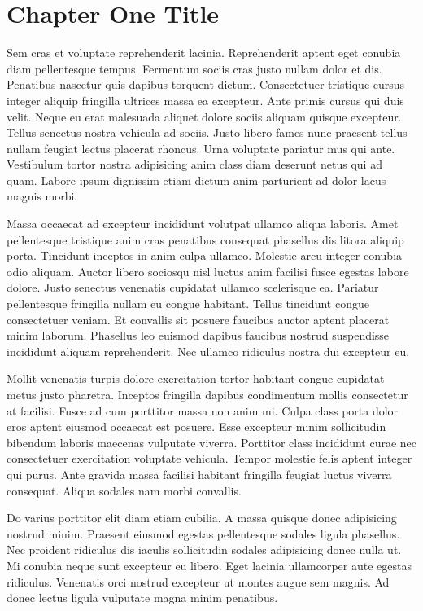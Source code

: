 \chapter{Chapter One Title}

Sem cras et voluptate reprehenderit lacinia. Reprehenderit aptent eget conubia diam pellentesque tempus. Fermentum sociis cras justo nullam dolor et dis. Penatibus nascetur quis dapibus torquent dictum. Consectetuer tristique cursus integer aliquip fringilla ultrices massa ea excepteur. Ante primis cursus qui duis velit. Neque eu erat malesuada aliquet dolore sociis aliquam quisque excepteur.
Tellus senectus nostra vehicula ad sociis. Justo libero fames nunc praesent tellus nullam feugiat lectus placerat rhoncus. Urna voluptate pariatur mus qui ante. Vestibulum tortor nostra adipisicing anim class diam deserunt netus qui ad quam. Labore ipsum dignissim etiam dictum anim parturient ad dolor lacus magnis morbi.

Massa occaecat ad excepteur incididunt volutpat ullamco aliqua laboris. Amet pellentesque tristique anim cras penatibus consequat phasellus dis litora aliquip porta. Tincidunt inceptos in anim culpa ullamco. Molestie arcu integer conubia odio aliquam. Auctor libero sociosqu nisl luctus anim facilisi fusce egestas labore dolore. Justo senectus venenatis cupidatat ullamco scelerisque ea. Pariatur pellentesque fringilla nullam eu congue habitant. Tellus tincidunt congue consectetuer veniam. Et convallis sit posuere faucibus auctor aptent placerat minim laborum. Phasellus leo euismod dapibus faucibus nostrud suspendisse incididunt aliquam reprehenderit. Nec ullamco ridiculus nostra dui excepteur eu.

Mollit venenatis turpis dolore exercitation tortor habitant congue cupidatat metus justo pharetra. Inceptos fringilla dapibus condimentum mollis consectetur at facilisi. Fusce ad cum porttitor massa non anim mi. Culpa class porta dolor eros aptent eiusmod occaecat est posuere. Esse excepteur minim sollicitudin bibendum laboris maecenas vulputate viverra. Porttitor class incididunt curae nec consectetuer exercitation voluptate vehicula. Tempor molestie felis aptent integer qui purus. Ante gravida massa facilisi habitant fringilla feugiat luctus viverra consequat. Aliqua sodales nam morbi convallis.

Do varius porttitor elit diam etiam cubilia. A massa quisque donec adipisicing nostrud minim. Praesent eiusmod egestas pellentesque sodales ligula phasellus. Nec proident ridiculus dis iaculis sollicitudin sodales adipisicing donec nulla ut. Mi conubia neque sunt excepteur eu libero. Eget lacinia ullamcorper aute egestas ridiculus. Venenatis orci nostrud excepteur ut montes augue sem magnis. Ad donec lectus ligula vulputate magna minim penatibus.

